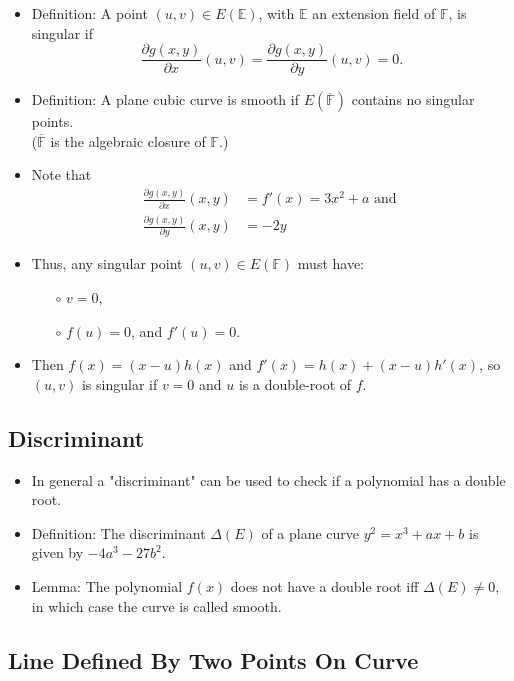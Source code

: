 \documentclass[a4paper]{scrartcl}
\begin{document}
\begin{itemize}
\item Definition: A point $(u,v) \in E(\mathbb{E})$, with $\mathbb{E}$ an extension field of $\mathbb{F}$, is singular if $$\frac{\partial g(x,y)}{\partial x}(u,v) = \frac{\partial g(x,y)}{\partial y}(u,v) = 0.$$
\item Definition: A plane cubic curve is smooth if $E(\overline{\mathbb{F}})$ contains no singular points.\\($\overline{\mathbb{F}}$ is the algebraic closure of $\mathbb{F}$.)
\item Note that
\begin{align*}
\frac{\partial g(x,y)}{\partial x}(x,y) &= f'(x) = 3x^2 + a \text{\ and \ }\\
\frac{\partial g(x,y)}{\partial y}(x,y) &= -2y
\end{align*}
\item Thus, any singular point $(u,v) \in E(\mathbb{F})$ must have:
\begin{itemize}
\item [$\circ$] $v=0$,
\item [$\circ$] $f(u) = 0$, and $f'(u) = 0$.
\end{itemize}
\item Then $f(x) = (x-u)h(x)$ and $f'(x) = h(x) + (x-u)h'(x)$, so $(u,v)$ is singular if $v=0$ and $u$ is a double-root of $f$.
\end{itemize}

\subsection*{Discriminant}

\begin{itemize}
\item In general a "discriminant" can be used to check if a polynomial has a double root.
\item Definition: The discriminant $\Delta(E)$ of a plane curve $y^2 = x^3 + ax + b$ is given by $-4a^3 - 27b^2$.
\item Lemma: The polynomial $f(x)$ does not have a double root iff $\Delta(E) \neq 0$, in which case the curve is called smooth.
\end{itemize}

\subsection*{Line Defined By Two Points On Curve}
\end{document}
